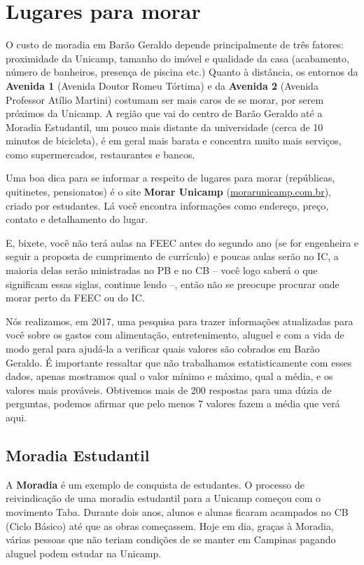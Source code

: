 
\section{Lugares para morar}

O custo de moradia em Barão Geraldo depende principalmente de três fatores:
proximidade da Unicamp, tamanho do imóvel e qualidade da casa (acabamento,
número de banheiros, presença de piscina etc.) Quanto à distância, os entornos
da \textbf{Avenida 1} (Avenida Doutor Romeu Tórtima) e da \textbf{Avenida 2}
(Avenida Professor Atílio Martini) costumam ser mais caros de se morar, por
serem próximos da Unicamp. A região que vai do centro de Barão Geraldo até a
Moradia Estudantil, um pouco mais distante da universidade (cerca de 10 minutos
de bicicleta), é em geral mais barata e concentra muito mais serviços, como
supermercados, restaurantes e bancos.

Uma boa dica para se informar a respeito de lugares para morar (repúblicas,
quitinetes, pensionatos) é o site \textbf{Morar Unicamp}
(\url{morarunicamp.com.br}), criado por estudantes. Lá você encontra
informações como endereço, preço, contato e detalhamento do lugar.

E, bixete, você não terá aulas na FEEC antes do segundo ano (se for engenheira
e seguir a proposta de cumprimento de currículo) e poucas aulas serão no IC, a
maioria delas serão ministradas no PB e no CB -- você logo saberá o que
significam essas siglas, continue lendo --, então não se preocupe procurar onde
morar perto da FEEC ou do IC.

Nós realizamos, em 2017, uma pesquisa para trazer informações atualizadas para
você sobre os gastos com alimentação, entretenimento, aluguel e com a vida de
modo geral para ajudá-la a verificar quais valores são cobrados em Barão
Geraldo. É importante ressaltar que não trabalhamos estatisticamente com esses
dados, apenas mostramos qual o valor mínimo e máximo, qual a média, e os
valores mais prováveis. Obtivemos mais de 200 respostas para uma dúzia de
perguntas, podemos afirmar que pelo menos 7 valores fazem a média que verá
aqui.

\subsection{Moradia Estudantil}

A \textbf{Moradia} é um exemplo de conquista de estudantes. O processo de
reivindicação de uma moradia estudantil para a Unicamp começou com o movimento
Taba. Durante dois anos, alunos e alunas ficaram acampados no CB (Ciclo Básico)
até que as obras começassem. Hoje em dia, graças à Moradia, várias pessoas que
não teriam condições de se manter em Campinas pagando aluguel podem estudar na
Unicamp.

